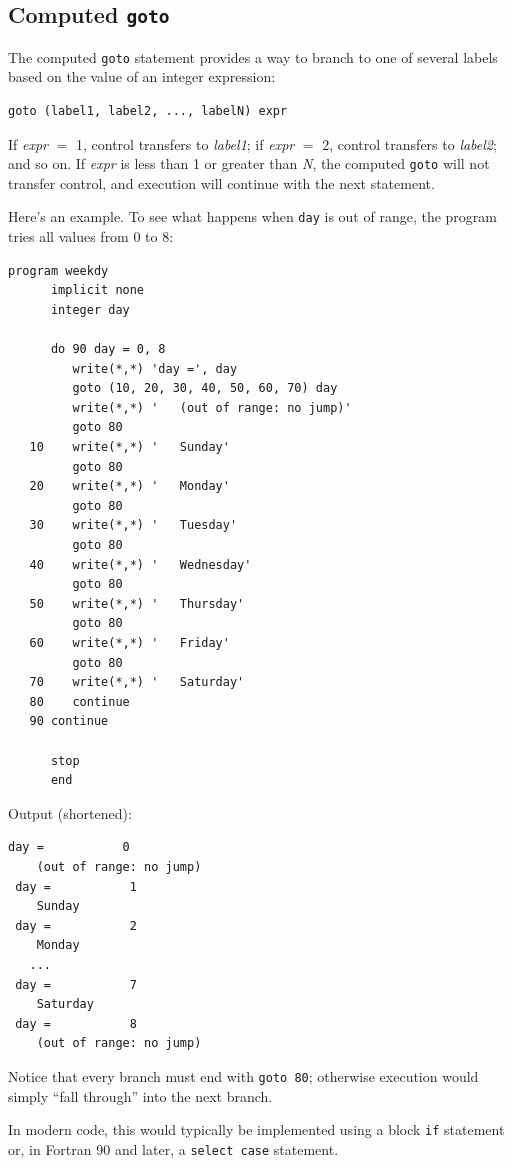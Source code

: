 \subsection{Computed \texttt{goto}}

The computed \texttt{goto} statement provides a way to branch to one of several labels based on the value of an integer expression:

\begin{lstlisting}[style=fortran77]
      goto (label1, label2, ..., labelN) expr
\end{lstlisting}

If \emph{expr} $=$ 1, control transfers to \emph{label1}; if \emph{expr} $=$ 2, control transfers to \emph{label2}; and so on. If \emph{expr} is less than 1 or greater than \emph{N}, the computed \texttt{goto} will not transfer control, and execution will continue with the next statement.

Here's an example. To see what happens when \texttt{day} is out of range, the program tries all values from 0 to 8:

\begin{lstlisting}[style=fortran77]
      program weekdy
      implicit none
      integer day

      do 90 day = 0, 8
         write(*,*) 'day =', day
         goto (10, 20, 30, 40, 50, 60, 70) day
         write(*,*) '   (out of range: no jump)'
         goto 80
   10    write(*,*) '   Sunday'
         goto 80
   20    write(*,*) '   Monday'
         goto 80
   30    write(*,*) '   Tuesday'
         goto 80
   40    write(*,*) '   Wednesday'
         goto 80
   50    write(*,*) '   Thursday'
         goto 80
   60    write(*,*) '   Friday'
         goto 80
   70    write(*,*) '   Saturday'
   80    continue
   90 continue

      stop
      end
\end{lstlisting}

Output (shortened):

\begin{lstlisting}[style=output]
 day =           0
    (out of range: no jump)
 day =           1
    Sunday
 day =           2
    Monday
   ...
 day =           7
    Saturday
 day =           8
    (out of range: no jump)
\end{lstlisting}

Notice that every branch must end with \texttt{goto 80}; otherwise execution would simply ``fall through'' into the next branch.

In modern code, this would typically be implemented using a block \texttt{if} statement or, in Fortran 90 and later, a \texttt{select case} statement.

